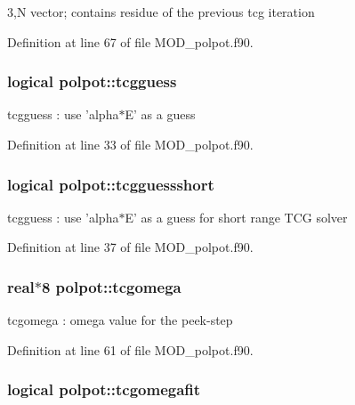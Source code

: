 3,N vector; contains residue of the previous tcg iteration 



Definition at line 67 of file M\-O\-D\-\_\-polpot.\-f90.

\hypertarget{classpolpot_a5454003eb94f118081671ff0d09104a5}{
\subsubsection[{tcgguess}]{\setlength{\rightskip}{0pt plus 5cm}logical polpot\-::tcgguess}}\label{classpolpot_a5454003eb94f118081671ff0d09104a5}


tcgguess \-: use 'alpha$\ast$\-E' as a guess 



Definition at line 33 of file M\-O\-D\-\_\-polpot.\-f90.

\hypertarget{classpolpot_a7b7f20d7e1f0d670a5044c576dc48915}{
\subsubsection[{tcgguessshort}]{\setlength{\rightskip}{0pt plus 5cm}logical polpot\-::tcgguessshort}}\label{classpolpot_a7b7f20d7e1f0d670a5044c576dc48915}


tcgguess \-: use 'alpha$\ast$\-E' as a guess for short range T\-C\-G solver 



Definition at line 37 of file M\-O\-D\-\_\-polpot.\-f90.

\hypertarget{classpolpot_a2fe3943424bc94f38076ba1856914a0b}{
\subsubsection[{tcgomega}]{\setlength{\rightskip}{0pt plus 5cm}real$\ast$8 polpot\-::tcgomega}}\label{classpolpot_a2fe3943424bc94f38076ba1856914a0b}


tcgomega \-: omega value for the peek-\/step 



Definition at line 61 of file M\-O\-D\-\_\-polpot.\-f90.

\hypertarget{classpolpot_afd293680c0d460cc93c98b0440c8996b}{
\subsubsection[{tcgomegafit}]{\setlength{\rightskip}{0pt plus 5cm}logical polpot\-::tcgomegafit}}\label{classpolpot_afd293680c0d460cc93c98b0440c8996b}


